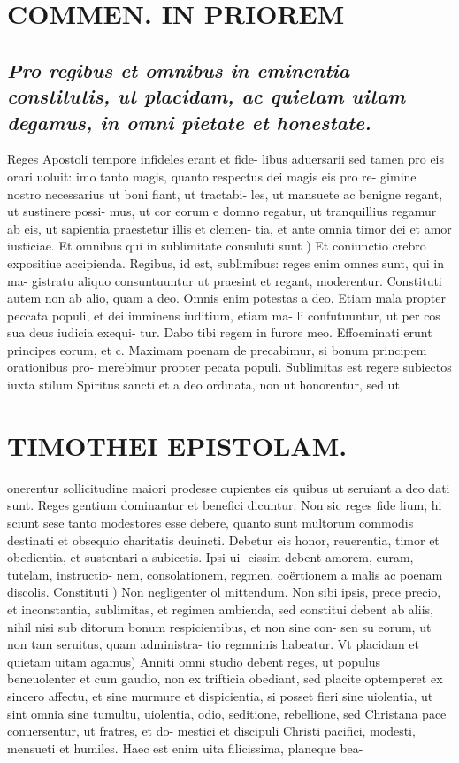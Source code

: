 \documentclass{article}
\begin{document}
\begin{pages}
\section*{COMMEN. IN PRIOREM }
\marginpar{[ p.44 ]}
{}
\subsection*{\textit{Pro regibus et omnibus in eminentia constitutis, ut placidam, ac quietam uitam degamus, in omni pietate et honestate. }}\pstart Reges Apostoli tempore infideles erant et fide- libus aduersarii sed tamen pro eis orari uoluit: imo tanto magis, quanto respectus dei magis eis pro re- gimine nostro necessarius ut boni fiant, ut tractabi- les, ut mansuete ac benigne regant, ut sustinere possi- mus, ut cor eorum e domno regatur, ut tranquillius regamur ab eis, ut sapientia praestetur illis et clemen- tia, et ante omnia timor dei et amor iusticiae.  \pend\pstart Et omnibus qui in sublimitate consuluti sunt ) Et coniunctio crebro expositiue accipienda. Regibus, id est, sublimibus: reges enim omnes sunt, qui in ma- gistratu aliquo consuntuuntur ut praesint et regant, moderentur. Constituti autem non ab alio, quam a deo. Omnis enim potestas a deo. Etiam mala propter peccata populi, et dei imminens iuditium, etiam ma- li confutuuntur, ut per cos sua deus iudicia exequi- tur. Dabo tibi regem in furore meo. Effoeminati erunt principes eorum, et c. Maximam poenam de precabimur, si bonum principem orationibus pro- merebimur propter pecata populi.  \pend\pstart Sublimitas est regere subiectos iuxta stilum Spiritus sancti et a deo ordinata, non ut honorentur, sed ut  \pend
\section*{TIMOTHEI EPISTOLAM. }
\marginpar{[ p.45 ]}\pstart onerentur sollicitudine maiori prodesse cupientes eis quibus ut seruiant a deo dati sunt. Reges gentium dominantur et benefici dicuntur. Non sic reges fide lium, hi sciunt sese tanto modestores esse debere, quanto sunt multorum commodis destinati et obsequio charitatis deuincti. Debetur eis honor, reuerentia, timor et obedientia, et sustentari a subiectis. Ipsi ui- cissim debent amorem, curam, tutelam, instructio- nem, consolationem, regmen, coërtionem a malis ac poenam discolis.  \pend\pstart Constituti ) Non negligenter ol mittendum. Non sibi ipsis, prece precio, et inconstantia, sublimitas, et regimen ambienda, sed constitui debent ab aliis, nihil nisi sub ditorum bonum respicientibus, et non sine con- sen su eorum, ut non tam seruitus, quam administra- tio regmninis habeatur.  \pend\pstart Vt placidam et quietam uitam agamus) Anniti omni studio debent reges, ut populus beneuolenter et cum gaudio, non ex trifticia obediant, sed placite optemperet ex sincero affectu, et sine murmure et dispicientia, si posset fieri sine uiolentia, ut sint omnia sine tumultu, uiolentia, odio, seditione, rebellione, sed Christana pace conuersentur, ut fratres, et do- mestici et discipuli Christi pacifici, modesti, mensueti et humiles. Haec est enim uita filicissima, planeque bea-  \pend

\end{pages}
\end{document}
